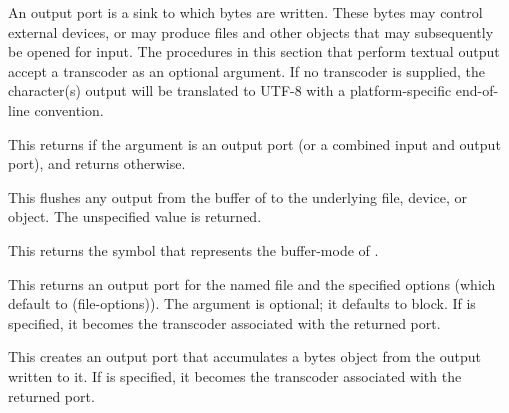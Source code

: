 An output port is a sink to which bytes are written. These bytes may control
external devices, or may produce files and other objects that may
subsequently be opened for input.  The procedures in this section
that perform
textual output accept a transcoder as an optional argument.  If no
transcoder is supplied, the character(s) output will be translated to
UTF-8 with a platform-specific end-of-line convention.

\begin{entry}{%
}
   
This returns \schtrue{} if the argument is an output port (or a
combined input and output port), and returns \schfalse{} otherwise.
\end{entry}   

\begin{entry}{%
}
   
This flushes any output from the buffer of  to the
underlying file, device, or object. The unspecified value is returned.
\end{entry}

\begin{entry}{%
}
   
This returns the symbol that represents the buffer-mode of
.
\end{entry}

\begin{entry}{%
}

This returns an output port for the named file and the specified
options (which default to {\cf (file-options)}). The 
argument is optional; it defaults to {\cf block}.  If 
is specified, it becomes the transcoder associated with the returned
port.
\end{entry}   

\begin{entry}{%
}

This creates an output port that accumulates a bytes object from the
output written to it.  If  is specified, it becomes
the transcoder associated with the returned port.
\end{entry}

